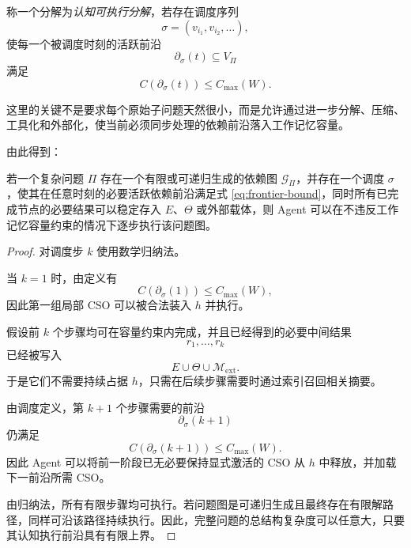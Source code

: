 称一个分解为\emph{认知可执行分解}，若存在调度序列
\begin{equation}
\sigma
=
(v_{i_1},v_{i_2},\ldots),
\end{equation}
使每一个被调度时刻的活跃前沿
\begin{equation}
\partial_\sigma(t)
\subseteq V_\Pi
\end{equation}
满足
\begin{equation}
C\left(
\partial_\sigma(t)
\right)
\leq
C_{\max}(W).
\label{eq:frontier-bound}
\end{equation}

这里的关键不是要求每个原始子问题天然很小，而是允许通过进一步分解、压缩、工具化和外部化，使当前必须同步处理的依赖前沿落入工作记忆容量。

由此得到：

\begin{theorem}[有限前沿可执行定理]
若一个复杂问题 $\Pi$ 存在一个有限或可递归生成的依赖图 $\mathcal G_\Pi$，并存在一个调度 $\sigma$，使其在任意时刻的必要活跃依赖前沿满足式 \eqref{eq:frontier-bound}，同时所有已完成节点的必要结果可以稳定存入 $E$、$\Theta$ 或外部载体，则 Agent 可以在不违反工作记忆容量约束的情况下逐步执行该问题图。
\end{theorem}

\begin{proof}
对调度步 $k$ 使用数学归纳法。

当 $k=1$ 时，由定义有
\begin{equation}
C(\partial_\sigma(1))
\leq
C_{\max}(W),
\end{equation}
因此第一组局部 CSO 可以被合法装入 $h$ 并执行。

假设前 $k$ 个步骤均可在容量约束内完成，并且已经得到的必要中间结果
\begin{equation}
r_1,\ldots,r_k
\end{equation}
已经被写入
\begin{equation}
E\cup\Theta\cup\mathcal M_{\mathrm{ext}}.
\end{equation}
于是它们不需要持续占据 $h$，只需在后续步骤需要时通过索引召回相关摘要。

由调度定义，第 $k+1$ 个步骤需要的前沿
\begin{equation}
\partial_\sigma(k+1)
\end{equation}
仍满足
\begin{equation}
C(\partial_\sigma(k+1))
\leq
C_{\max}(W).
\end{equation}
因此 Agent 可以将前一阶段已无必要保持显式激活的 CSO 从 $h$ 中释放，并加载下一前沿所需 CSO。

由归纳法，所有有限步骤均可执行。若问题图是可递归生成且最终存在有限解路径，同样可沿该路径持续执行。因此，完整问题的总结构复杂度可以任意大，只要其认知执行前沿具有有限上界。
\end{proof}

